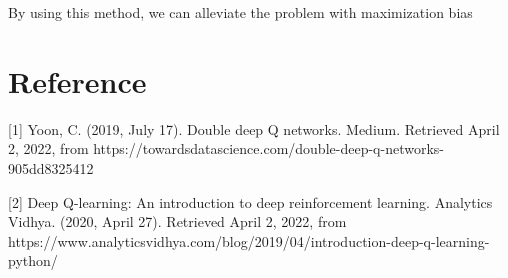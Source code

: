 \documentclass[11pt]{article}
\begin{document}
By using this method, we can alleviate the problem with maximization bias

\section{Reference}
[1] Yoon, C. (2019, July 17). Double deep Q networks. Medium. Retrieved April 2, 2022, from https://towardsdatascience.com/double-deep-q-networks-905dd8325412 

[2] Deep Q-learning: An introduction to deep reinforcement learning. Analytics Vidhya. (2020, April 27). Retrieved April 2, 2022, from https://www.analyticsvidhya.com/blog/2019/04/introduction-deep-q-learning-python/ 


\end{document}
